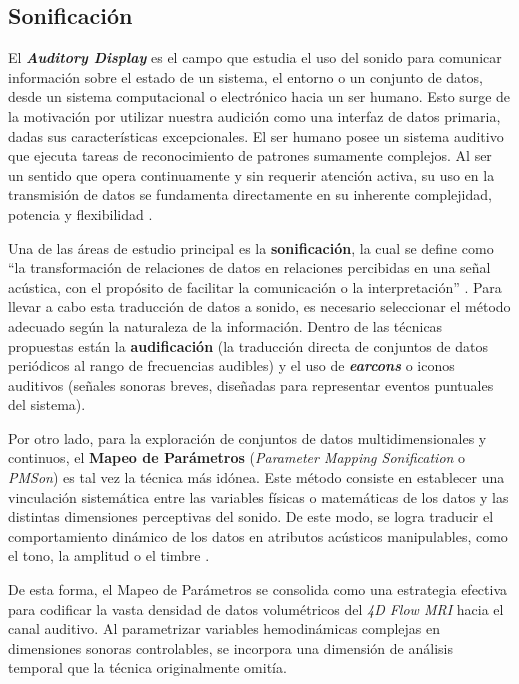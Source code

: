 \subsection{Sonificación}

El \textit{\textbf{Auditory Display}} es el campo que estudia el uso del sonido para comunicar información sobre el estado de un sistema, el entorno o un conjunto de datos, desde un sistema computacional o electrónico hacia un ser humano. Esto surge de la motivación por utilizar nuestra audición como una interfaz de datos primaria, dadas sus características excepcionales. El ser humano posee un sistema auditivo que ejecuta tareas de reconocimiento de patrones sumamente complejos. Al ser un sentido que opera continuamente y sin requerir atención activa, su uso en la transmisión de datos se fundamenta directamente en su inherente complejidad, potencia y flexibilidad \cite{hermann2011sonification}.

Una de las áreas de estudio principal es la \textbf{sonificación}, la cual se define como ``la transformación de relaciones de datos en relaciones percibidas en una señal acústica, con el propósito de facilitar la comunicación o la interpretación'' \cite{kramer1999sonification}. Para llevar a cabo esta traducción de datos a sonido, es necesario seleccionar el método adecuado según la naturaleza de la información. Dentro de las técnicas propuestas están la \textbf{audificación} (la traducción directa de conjuntos de datos periódicos al rango de frecuencias audibles) y el uso de \textbf{\textit{earcons}} o iconos auditivos (señales sonoras breves, diseñadas para representar eventos puntuales del sistema).

Por otro lado, para la exploración de conjuntos de datos multidimensionales y continuos, el \textbf{Mapeo de Parámetros} (\textit{Parameter Mapping Sonification} o \textit{PMSon}) es tal vez la técnica más idónea. Este método consiste en establecer una vinculación sistemática entre las variables físicas o matemáticas de los datos y las distintas dimensiones perceptivas del sonido. De este modo, se logra traducir el comportamiento dinámico de los datos en atributos acústicos manipulables, como el tono, la amplitud o el timbre \cite{dubus2013systematic}.

De esta forma, el Mapeo de Parámetros se consolida como una estrategia efectiva para codificar la vasta densidad de datos volumétricos del \textit{4D Flow MRI} hacia el canal auditivo. Al parametrizar variables hemodinámicas complejas en dimensiones sonoras controlables, se incorpora una dimensión de análisis temporal que la técnica originalmente omitía.


